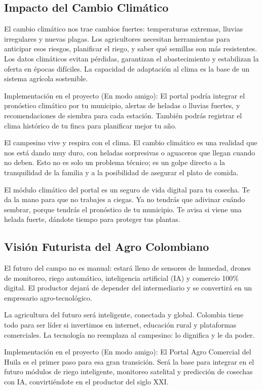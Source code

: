 \subsection{Impacto del Cambio Climático}
El cambio climático nos trae cambios fuertes: temperaturas extremas, lluvias irregulares y nuevas plagas. Los agricultores necesitan herramientas para anticipar esos riesgos, planificar el riego, y saber qué semillas son más resistentes. Los datos climáticos evitan pérdidas, garantizan el abastecimiento y estabilizan la oferta en épocas difíciles. La capacidad de adaptación al clima es la base de un sistema agrícola sostenible.

Implementación en el proyecto (En modo amigo): El portal podría integrar el pronóstico climático por tu municipio, alertas de heladas o lluvias fuertes, y recomendaciones de siembra para cada estación. También podrás registrar el clima histórico de tu finca para planificar mejor tu año.

El campesino vive y respira con el clima. El cambio climático es una realidad que nos está dando muy duro, con heladas sorpresivas o aguaceros que llegan cuando no deben. Esto no es solo un problema técnico; es un golpe directo a la tranquilidad de la familia y a la posibilidad de asegurar el plato de comida.

El módulo climático del portal es un seguro de vida digital para tu cosecha. Te da la mano para que no trabajes a ciegas. Ya no tendrás que adivinar cuándo sembrar, porque tendrás el pronóstico de tu municipio. Te avisa si viene una helada fuerte, dándote tiempo para proteger tus plantas.

\subsection{Visión Futurista del Agro Colombiano}
El futuro del campo no es manual: estará lleno de sensores de humedad, drones de monitoreo, riego automático, inteligencia artificial (IA) y comercio 100\% digital. El productor dejará de depender del intermediario y se convertirá en un empresario agro-tecnológico.

La agricultura del futuro será inteligente, conectada y global. Colombia tiene todo para ser líder si invertimos en internet, educación rural y plataformas comerciales. La tecnología no reemplaza al campesino: lo dignifica y le da poder.

Implementación en el proyecto (En modo amigo): El Portal Agro Comercial del Huila es el primer paso para esa gran transición. Será la base para integrar en el futuro módulos de riego inteligente, monitoreo satelital y predicción de cosechas con IA, convirtiéndote en el productor del siglo XXI.

